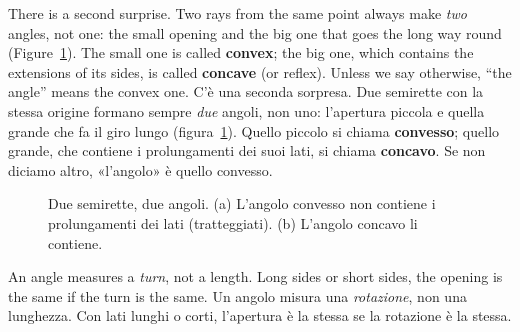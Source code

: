 \begin{bi}
There is a second surprise. Two rays from the same point always make \emph{two} angles, not one: the small opening and the big one that goes the long way round (Figure~\ref{fig:convex}). The small one is called \textbf{convex}; the big one, which contains the extensions of its sides, is called \textbf{concave} (or reflex). Unless we say otherwise, ``the angle'' means the convex one.
\IT
C'è una seconda sorpresa. Due semirette con la stessa origine formano sempre \emph{due} angoli, non uno: l'apertura piccola e quella grande che fa il giro lungo (figura~\ref{fig:convex}). Quello piccolo si chiama \textbf{convesso}; quello grande, che contiene i prolungamenti dei suoi lati, si chiama \textbf{concavo}. Se non diciamo altro, «l'angolo» è quello convesso.
\end{bi}

\begin{figure}[htbp]
\centering
%
      {Due semirette, due angoli. (a) L'angolo convesso non contiene i prolungamenti dei lati (tratteggiati). (b) L'angolo concavo li contiene.}
\label{fig:convex}
\end{figure}

\begin{keyidea}{}{}
An angle measures a \emph{turn}, not a length. Long sides or short sides, the opening is the same if the turn is the same.
\tcblower
Un angolo misura una \emph{rotazione}, non una lunghezza. Con lati lunghi o corti, l'apertura è la stessa se la rotazione è la stessa.
\end{keyidea}

